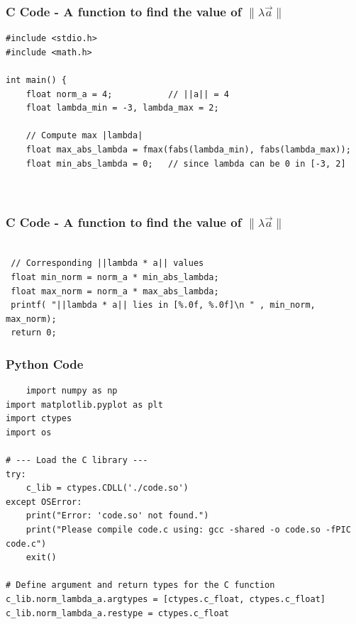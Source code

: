 \documentclass{beamer}
\begin{document}
\begin{frame}[fragile]
    \frametitle{C Code - A function to find the value of $\lVert \lambda \vec{a} \rVert$ }

    \begin{lstlisting}
#include <stdio.h>
#include <math.h>

int main() {
    float norm_a = 4;           // ||a|| = 4
    float lambda_min = -3, lambda_max = 2;

    // Compute max |lambda|
    float max_abs_lambda = fmax(fabs(lambda_min), fabs(lambda_max));
    float min_abs_lambda = 0;   // since lambda can be 0 in [-3, 2]

    
     \end{lstlisting}
\end{frame}


    
\begin{frame}[fragile]
\frametitle{C Code - A function to find the value of $\lVert \lambda \vec{a} \rVert$ }

\begin{lstlisting}

 // Corresponding ||lambda * a|| values
 float min_norm = norm_a * min_abs_lambda;
 float max_norm = norm_a * max_abs_lambda;    
 printf( "||lambda * a|| lies in [%.0f, %.0f]\n " , min_norm, max_norm);
 return 0;
\end{lstlisting}

\end{frame}




\begin{frame}[fragile]
    \frametitle{Python Code}
    \begin{lstlisting}
    import numpy as np
import matplotlib.pyplot as plt
import ctypes
import os

# --- Load the C library ---
try:
    c_lib = ctypes.CDLL('./code.so')
except OSError:
    print("Error: 'code.so' not found.")
    print("Please compile code.c using: gcc -shared -o code.so -fPIC code.c")
    exit()

# Define argument and return types for the C function
c_lib.norm_lambda_a.argtypes = [ctypes.c_float, ctypes.c_float]
c_lib.norm_lambda_a.restype = ctypes.c_float
    \end{lstlisting}
\end{frame}
\end{document}
